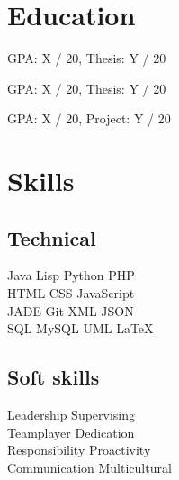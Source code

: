 \documentclass[]{deedy-resume-openfont}
\begin{document}
%
%

%
%

%
%
\begin{minipage}[t]{0.26\textwidth} 

\section{Education} 
GPA: X / 20, Thesis: Y / 20
\sectionsep

GPA: X / 20, Thesis: Y / 20
\sectionsep

GPA: X / 20, Project: Y / 20
\sectionsep

\section{Skills}
\subsection{Technical}
Java \textbullet{}   Lisp \textbullet{} Python \textbullet{} PHP \\ 
HTML \textbullet{} CSS \textbullet{} JavaScript \\ 
JADE \textbullet{} Git \textbullet{} XML \textbullet{} JSON \\
SQL \textbullet{} MySQL \textbullet{} UML \textbullet{} \LaTeX \\
\sectionsep
\subsection{Soft skills}
Leadership \textbullet{} Supervising \\
Teamplayer \textbullet{} Dedication \\
Responsibility \textbullet{} Proactivity \\
Communication \textbullet{} Multicultural
\sectionsep


\end{minipage}
\end{document}
